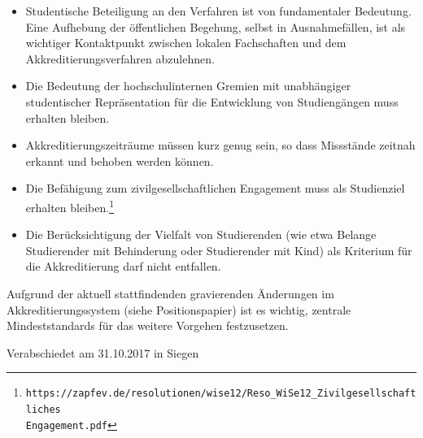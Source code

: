 \documentclass[DIV=calc]{scrartcl}
\begin{document}
\begin{itemize}
\item Studentische Beteiligung an den Verfahren ist von fundamentaler Bedeutung. Eine Aufhebung der öffentlichen Begehung, selbst in Ausnahmefällen, ist als wichtiger Kontaktpunkt zwischen lokalen Fachschaften und dem Akkreditierungsverfahren abzulehnen.
\item Die Bedeutung der hochschulinternen Gremien mit unabhängiger studentischer Repräsentation für die Entwicklung von Studiengängen muss erhalten bleiben.
\item Akkreditierungszeiträume müssen kurz genug sein, so dass Missstände zeitnah erkannt und behoben werden können.
\item Die Befähigung zum zivilgesellschaftlichen Engagement muss als Studienziel erhalten bleiben.\footnote{\texttt{https://zapfev.de/resolutionen/wise12/Reso\_WiSe12\_Zivilgesellschaftliches \\ Engagement.pdf}}
\item Die Berücksichtigung der Vielfalt von Studierenden (wie etwa Belange Studierender mit Behinderung oder Studierender mit Kind) als Kriterium für die Akkreditierung darf nicht entfallen.
\end{itemize}
Aufgrund der aktuell stattfindenden gravierenden Änderungen im Akkreditierungssystem (siehe Positionspapier) ist es wichtig, zentrale Mindeststandards für das weitere Vorgehen festzusetzen. 
\vspace{-0.5\baselineskip}
    \begin{flushright}
        Verabschiedet am 31.10.2017 in Siegen
    \end{flushright}
\end{document}
